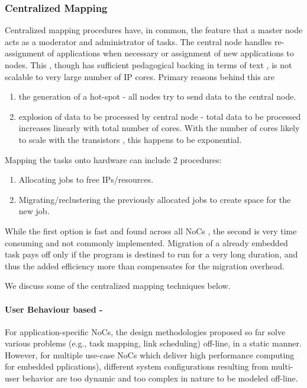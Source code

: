\subsubsection{Centralized Mapping}

Centralized mapping procedures have, in common, the feature that a
master node acts as a moderator and administrator of tasks. The central
node handles re-assignment of applications when necessary or assignment
of new applications to nodes. This , though has sufficient pedagogical
backing in terms of text , is not scalable to very large number of
IP cores. Primary reasons behind this are
\begin{enumerate}
\item the generation of a hot-spot - all nodes try to send data to the central
node.
\item explosion of data to be processed by central node - total data to
be processed increases linearly with total number of cores. With the
number of cores likely to scale with the transistors , this happens
to be exponential.
\end{enumerate}
Mapping the tasks onto hardware can include 2 procedures:
\begin{enumerate}
\item Allocating jobs to free IPs/resources.
\item Migrating/reclustering the previously allocated jobs to create space
for the new job.
\end{enumerate}
While the first option is fast and found across all NoCs , the second
is very time consuming and not commonly implemented. Migration of
a already embedded task pays off only if the program is destined to
run for a very long duration, and thus the added efficiency more than
compensates for the migration overhead. 

We discuss some of the centralized mapping techniques below.


\paragraph{User Behaviour based - }

For application-specific NoCs, the design methodologies proposed so
far solve various problems (e.g., task mapping, link scheduling) off-line,
in a static manner. However, for multiple use-case NoCs which deliver
high performance computing for embedded pplications), different system
configurations resulting from multi-user behavior are too dynamic
and too complex in nature to be modeled off-line. \cite{Chou:2008:UDT:1403375.1403675}

